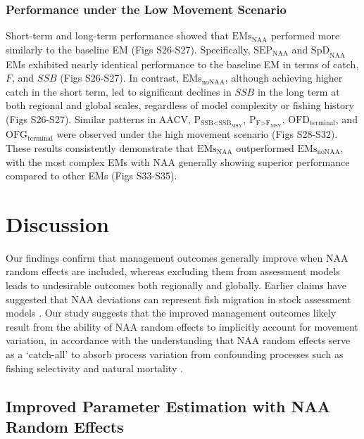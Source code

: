 \documentclass[
  12pt,
]{article}
\begin{document}
\hypertarget{performance-under-the-low-movement-scenario}{%
\subsubsection{Performance under the Low Movement
Scenario}\label{performance-under-the-low-movement-scenario}}

Short-term and long-term performance showed that
\(\text{EMs}_{\scriptscriptstyle \text{NAA}}\) performed more similarly
to the baseline EM (Figs S26-S27). Specifically,
\(\text{SEP}_{\scriptscriptstyle \text{NAA}}\) and
\(\text{SpD}_{\scriptscriptstyle \text{NAA}}\) EMs exhibited nearly
identical performance to the baseline EM in terms of catch, \(F\), and
\(SSB\) (Figs S26-S27). In contrast,
\(\text{EMs}_{\scriptscriptstyle \text{noNAA}}\), although achieving
higher catch in the short term, led to significant declines in \(SSB\)
in the long term at both regional and global scales, regardless of model
complexity or fishing history (Figs S26-S27). Similar patterns in AACV,
\(\text{P}_{\text{SSB<SSB}_{\text{MSY}}}\),
\(\text{P}_{\text{F>F}_{\text{MSY}}}\), \(\text{OFD}_\text{terminal}\),
and \(\text{OFG}_\text{terminal}\) were observed under the high movement
scenario (Figs S28-S32). These results consistently demonstrate that
\(\text{EMs}_{\scriptscriptstyle \text{NAA}}\) outperformed
\(\text{EMs}_{\scriptscriptstyle \text{noNAA}}\), with the most complex
EMs with NAA generally showing superior performance compared to other
EMs (Figs S33-S35).

\hypertarget{discussion}{%
\section{Discussion}\label{discussion}}

Our findings confirm that management outcomes generally improve when NAA
random effects are included, whereas excluding them from assessment
models leads to undesirable outcomes both regionally and globally.
Earlier claims have suggested that NAA deviations can represent fish
migration in stock assessment models \citep{Gudmundsson2012}. Our study
suggests that the improved management outcomes likely result from the
ability of NAA random effects to implicitly account for movement
variation, in accordance with the understanding that NAA random effects
serve as a `catch-all' to absorb process variation from confounding
processes such as fishing selectivity and natural mortality
\citep{Li2024}.

\hypertarget{improved-parameter-estimation-with-naa-random-effects}{%
\subsection{Improved Parameter Estimation with NAA Random
Effects}\label{improved-parameter-estimation-with-naa-random-effects}}
\end{document}
